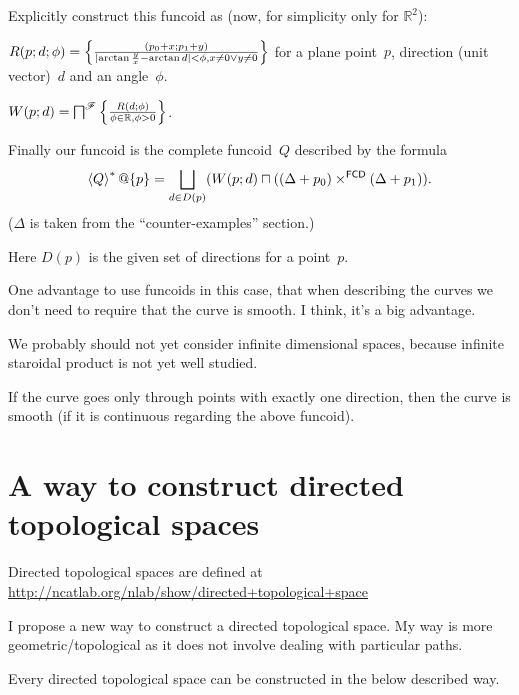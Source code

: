 Explicitly construct this funcoid as (now, for simplicity only for $\mathbb{R}^2$):

$R(p;d;\phi) = \left\{ \frac{(p_0+x;p_1+y)}{\lvert\arctan\frac{y}{x}-\arctan{d}\rvert<\phi, x\ne 0\lor y\ne 0}\right\}$  for a plane point~$p$, direction (unit vector)~$d$ and an angle~$\phi$.

$W(p;d) = \bigsqcap^{\mathscr{F}}\left\{ \frac{R(d;\phi)}{\phi\in\mathbb{R},\phi>0}\right\}$.

Finally our funcoid is the complete funcoid~$Q$ described by the formula
\[\left\langle Q\right\rangle ^{\ast}@\{p\} = \bigsqcup_{d\in D(p)} (W(p;d) \sqcap ((\Delta+p_0) \times^{\mathsf{FCD}} (\Delta+p_1)).
\] ($\Delta$ is taken from the ``counter-examples'' section.)

Here $D(p)$ is the given set of directions for a point~$p$.

One advantage to use funcoids in this case, that when describing the curves we don't need to require that the curve is smooth. I think, it's a big advantage.

 We probably should not yet consider infinite dimensional spaces,
because infinite staroidal product is not yet well studied.

\begin{conjecture}
If the curve goes only through points with exactly one direction, then the curve is smooth (if it is continuous regarding the above funcoid).
\end{conjecture}

\section{A way to construct directed topological spaces}


Directed topological spaces are defined at\\
\url{http://ncatlab.org/nlab/show/directed+topological+space}

I propose a new way to construct a directed topological space. My way is more geometric/topological as it does not involve dealing with particular paths.

\begin{conjecture}
Every directed topological space can be constructed in the below described way.
\end{conjecture}

